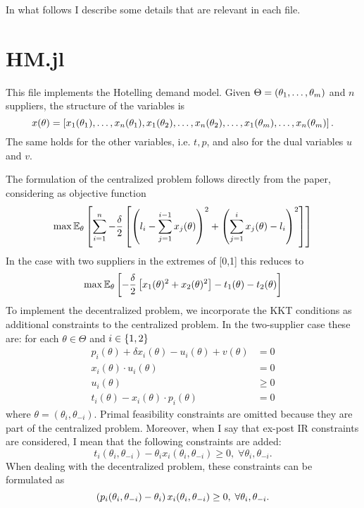 \documentclass[11pt, oneside]{article}
\begin{document}
In what follows I describe some details that are relevant in each file.

\section{HM.jl}
This file implements the Hotelling demand model. Given \(\Theta = \left(\theta_1, \ldots, \theta_m\right)\) and \(n\) suppliers, the structure of the variables
is
\[
x(\theta) = \left[x_1(\theta_1), \ldots, x_n(\theta_1), x_1(\theta_2), \ldots, x_n(\theta_2), \ldots, x_1(\theta_m), \ldots, x_n(\theta_m)\right].
\]
The same holds for the other variables, i.e. \(t, p\), and also for the dual variables \(u\) and \(v\).

The formulation of the centralized problem follows directly from the paper, considering as objective function
\[
\max \mathbb{E}_{\theta}\left[\sum_{i=1}^n
-\frac{\delta}{2}\left[ \left(l_i-\sum_{j=1}^{i-1} x_j(\theta)\right)^2 + \left(\sum_{j=1}^{i} x_j(\theta) - l_i\right)^2  \right] \right]
\]
In the case with two suppliers in the extremes of [0,1] this reduces to
\[
\max \mathbb{E}_{\theta}\left[
-\frac{\delta}{2}\left[ x_1(\theta)^2 + x_2(\theta)^2\right] - t_1(\theta) - t_2(\theta) \right]
\]
To implement the decentralized problem, we incorporate the KKT conditions as
additional constraints to the centralized problem. In the two-supplier case these are: for each \(\theta \in \Theta\) and \(i\in \left\{1,2\right\}\)
\[
\begin{split}
    p_i(\theta) + \delta x_i(\theta) - u_i(\theta) + v(\theta) &= 0 \\
    x_i(\theta)\cdot u_i(\theta) &= 0 \\
    u_i(\theta) & \geq 0 \\
    t_i(\theta) - x_i(\theta)\cdot p_i(\theta) &= 0
\end{split}
\]
where \(\theta = (\theta_i, \theta_{-i})\). Primal feasibility constraints are omitted because they are part of the centralized problem.
Moreover, when I say that ex-post IR constraints are considered, I mean that the following
constraints are added:
\[
t_i(\theta_i, \theta_{-i}) - \theta_i x_i(\theta_i, \theta_{-i}) \geq 0, \; \forall \theta_i, \theta_{-i}.
\]
When dealing with the decentralized problem, these constraints can be formulated as
\[
\left(p_i(\theta_i, \theta_{-i}) - \theta_i\right) x_i(\theta_i, \theta_{-i}) \geq 0, \; \forall \theta_i, \theta_{-i}.
\]
\end{document}

